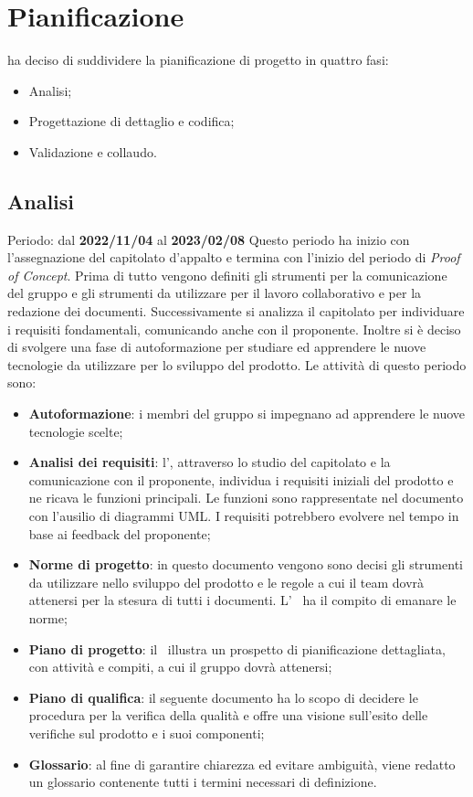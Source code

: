 \section{Pianificazione}
\groupName ha deciso di suddividere la pianificazione di progetto in quattro fasi:
\begin{itemize}
    \item Analisi;
    \item Progettazione di dettaglio e codifica;
    \item Validazione e collaudo.
\end{itemize}

\subsection{Analisi}
Periodo: dal \textbf{2022/11/04} al \textbf{2023/02/08} \newline
Questo periodo ha inizio con l'assegnazione del capitolato d'appalto e termina con l'inizio del periodo di \textit{Proof of Concept}.
Prima di tutto vengono definiti gli strumenti per la comunicazione del gruppo e gli strumenti da utilizzare per il lavoro collaborativo e
per la redazione dei documenti. Successivamente si analizza il capitolato per individuare i requisiti fondamentali, comunicando anche con 
il proponente.
Inoltre si è deciso di svolgere una fase di autoformazione per studiare ed apprendere le nuove tecnologie da utilizzare per lo sviluppo del prodotto.
Le attività di questo periodo sono:
\begin{itemize}
    \item \textbf{Autoformazione}: i membri del gruppo si impegnano ad apprendere le nuove tecnologie scelte;
    \item \textbf{Analisi dei requisiti}: l'\roleAnalyst, attraverso lo studio del capitolato e la comunicazione con il proponente,
            individua i requisiti iniziali del prodotto e ne ricava le funzioni principali. Le funzioni sono rappresentate nel documento 
            con l'ausilio di diagrammi UML\glo. I requisiti potrebbero evolvere nel tempo in base ai feedback del proponente;
    \item \textbf{Norme di progetto}: in questo documento vengono sono decisi gli strumenti da utilizzare nello sviluppo del prodotto 
            e le regole a cui il team dovrà attenersi per la stesura di tutti i documenti. L'\roleAdministrator~ ha il compito di emanare
            le norme;
    \item \textbf{Piano di progetto}: il \roleProjectManager ~illustra un prospetto di pianificazione dettagliata, con attività e compiti, 
                            a cui il gruppo dovrà attenersi;
    \item \textbf{Piano di qualifica}: il seguente documento ha lo scopo di decidere le procedura per la verifica della qualità e
            offre una visione sull'esito delle verifiche sul prodotto e i suoi componenti;
    \item \textbf{Glossario}: al fine di garantire chiarezza ed evitare ambiguità, viene redatto un glossario contenente tutti i termini necessari di definizione.
\end{itemize}
